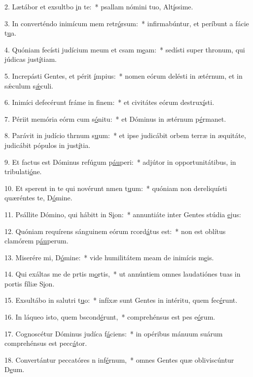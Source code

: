 2. Lætábor et exsultbo \uline{i}n te:~* psallam nómini tuo, Alt\uline{í}ssime.\par 
3. In converténdo inimícum mem retr\uline{ó}rsum:~* infirmabúntur, et períbunt a fácie t\uline{u}a.\par 
4. Quóniam fecísti judícium meum et csam m\uline{e}am:~* sedísti super thronum, qui júdicas just\uline{í}tiam.\par 
5. Increpásti Gentes, et périt \uline{í}mpius:~* nomen eórum delésti in ætérnum, et in sǽculum s\uline{ǽ}culi.\par 
6. Inimíci defecérunt fráme in f\uline{i}nem:~* et civitátes eórum destrux\uline{í}sti.\par 
7. Périit memória eórm cum s\uline{ó}nitu:~* et Dóminus in ætérnum p\uline{é}rmanet.\par 
8. Parávit in judício thrnum s\uline{u}um:~* et ipse judicábit orbem terræ in æquitáte, judicábit pópulos in just\uline{í}tia.\par 
9. Et factus est Dóminus refúgum p\uline{áu}peri:~* adjútor in opportunitátibus, in tribulati\uline{ó}ne.\par 
10. Et sperent in te qui novérunt nmen t\uline{u}um:~* quóniam non dereliquísti quæréntes te, D\uline{ó}mine.\par 
11. Psállite Dómino, qui hábitt in S\uline{i}on:~* annuntiáte inter Gentes stúdia \uline{e}jus:\par 
12. Quóniam requírens sánguinem eórum rcord\uline{á}tus est:~* non est oblítus clamórem p\uline{áu}perum.\par 
13. Miserére mi, D\uline{ó}mine:~* vide humilitátem meam de inimícis m\uline{e}is.\par 
14. Qui exáltas me de prtis m\uline{o}rtis,~* ut annúntiem omnes laudatiónes tuas in portis fíliæ S\uline{i}on.\par 
15. Exsultábo in salutri t\uline{u}o:~* infíxæ sunt Gentes in intéritu, quem fec\uline{é}runt.\par 
16. In láqueo isto, quem bscond\uline{é}runt,~* comprehénsus est pes e\uline{ó}rum.\par 
17. Cognoscétur Dóminus judíca f\uline{á}ciens:~* in opéribus mánuum suárum comprehénsus est pecc\uline{á}tor.\par 
18. Convertántur peccatóres n inf\uline{é}rnum,~* omnes Gentes quæ obliviscúntur D\uline{e}um.\par 
